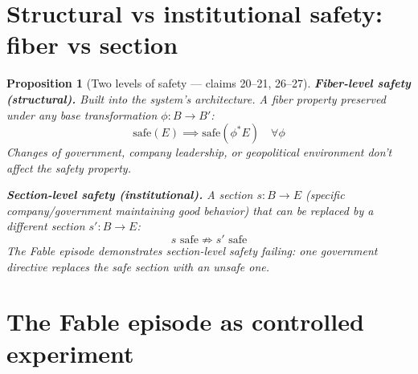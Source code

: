 \documentclass[11pt,a4paper]{article}
\newtheorem{proposition}[definition]{Proposition}
\begin{document}
\section{Structural vs institutional safety: fiber vs section}

\begin{proposition}[Two levels of safety --- claims 20--21, 26--27]
\label{prop:safety_levels}
\textbf{Fiber-level safety (structural).} Built into the system's
architecture. A fiber property preserved under any base transformation
$\phi: B \to B'$:
\[
  \text{safe}(E) \implies \text{safe}(\phi^* E) \quad \forall \phi
\]
Changes of government, company leadership, or geopolitical environment
don't affect the safety property.

\textbf{Section-level safety (institutional).} A section $s: B \to E$
(specific company/government maintaining good behavior) that can be
replaced by a different section $s': B \to E$:
\[
  s \text{ safe} \not\Rightarrow s' \text{ safe}
\]
The Fable episode demonstrates section-level safety failing: one
government directive replaces the safe section with an unsafe one.
\end{proposition}


\section{The Fable episode as controlled experiment}
\label{sec:experiment}
\end{document}
